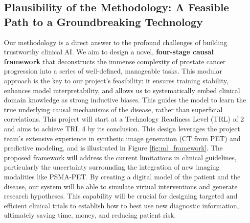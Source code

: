 \documentclass[11pt, a4paper]{article}
\begin{document}
\subsection{Plausibility of the Methodology: A Feasible Path to a Groundbreaking Technology}
Our methodology is a direct answer to the profound challenges of building trustworthy clinical AI. We aim to design a novel, \textbf{four-stage causal framework} that deconstructs the immense complexity of prostate cancer progression into a series of well-defined, manageable tasks. This modular approach is the key to our project's feasibility: it ensures training stability, enhances model interpretability, and allows us to systematically embed clinical domain knowledge as strong inductive biases. This guides the model to learn the true underlying causal mechanisms of the disease, rather than superficial correlations. This project will start at a Technology Readiness Level (TRL) of 2 and aims to achieve TRL 4 by its conclusion. This design leverages the project team's extensive experience in synthetic image generation (CT from PET) and predictive modeling, and is illustrated in Figure \ref{fig:ml_framework}. The proposed framework will address the current limitations in clinical guidelines, particularly the uncertainty surrounding the integration of new imaging modalities like PSMA-PET. By creating a digital model of the patient and the disease, our system will be able to simulate virtual interventions and generate research hypotheses. This capability will be crucial for designing targeted and efficient clinical trials to establish how to best use new diagnostic information, ultimately saving time, money, and reducing patient risk.
\end{document}
